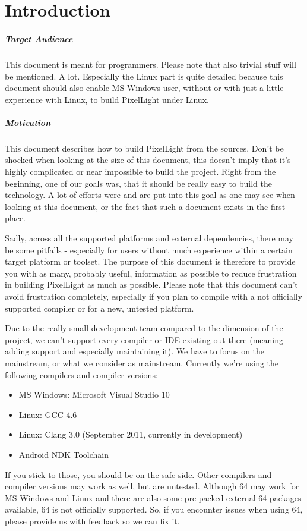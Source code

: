 \chapter{Introduction}


\paragraph{Target Audience}
This document is meant for programmers. Please note that also trivial stuff will be mentioned. A lot. Especially the Linux part is quite detailed because this document should also enable MS Windows user, without or with just a little experience with Linux, to build PixelLight under Linux.


\paragraph{Motivation}
This document describes how to build PixelLight from the sources. Don't be shocked when looking at the size of this document, this doesn't imply that it's highly complicated or near impossible to build the project. Right from the beginning, one of our goals was, that it should be really easy to build the technology. A lot of efforts were and are put into this goal as one may see when looking at this document, or the fact that such a document exists in the first place.

Sadly, across all the supported platforms and external dependencies, there may be some pitfalls - especially for users without much experience within a certain target platform or toolset. The purpose of this document is therefore to provide you with as many, probably useful, information as possible to reduce frustration in building PixelLight as much as possible. Please note that this document can't avoid frustration completely, especially if you plan to compile with a not officially supported compiler or for a new, untested platform.

Due to the really small development team compared to the dimension of the project, we can't support every compiler or IDE existing out there (meaning adding support and especially maintaining it). We have to focus on the mainstream, or what we consider as mainstream. Currently we're using the following compilers and compiler versions:
\begin{itemize}
\item{MS Windows: Microsoft Visual Studio 10}
\item{Linux: GCC 4.6}
\item{Linux: Clang 3.0 (September 2011, currently in development)}
\item{Android NDK Toolchain}
\end{itemize}
If you stick to those, you should be on the safe side. Other compilers and compiler versions may work as well, but are untested. Although \SI{64}{\bit} may work for MS Windows and Linux and there are also some pre-packed external \SI{64}{\bit} packages available, \SI{64}{\bit} is not officially supported. So, if you encounter issues when using \SI{64}{\bit}, please provide us with feedback so we can fix it.


